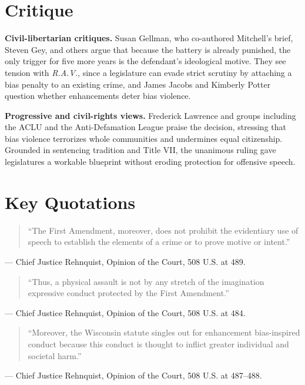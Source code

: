 \documentclass[12pt]{article}
\begin{document}
\section{Critique}

\textbf{Civil-libertarian critiques.} Susan Gellman, who co-authored Mitchell's brief, Steven Gey, and others argue that because the battery is already punished, the only trigger for five more years is the defendant's ideological motive. They see tension with \textit{R.A.V.}, since a legislature can evade strict scrutiny by attaching a bias penalty to an existing crime, and James Jacobs and Kimberly Potter question whether enhancements deter bias violence.

\textbf{Progressive and civil-rights views.} Frederick Lawrence and groups including the ACLU and the Anti-Defamation League praise the decision, stressing that bias violence terrorizes whole communities and undermines equal citizenship. Grounded in sentencing tradition and Title VII, the unanimous ruling gave legislatures a workable blueprint without eroding protection for offensive speech.

\section{Key Quotations}

\begin{quote}
``The First Amendment, moreover, does not prohibit the evidentiary use of speech to establish the elements of a crime or to prove motive or intent.''
\end{quote}
\noindent --- Chief Justice Rehnquist, Opinion of the Court, 508 U.S. at 489.

\begin{quote}
``Thus, a physical assault is not by any stretch of the imagination expressive conduct protected by the First Amendment.''
\end{quote}
\noindent --- Chief Justice Rehnquist, Opinion of the Court, 508 U.S. at 484.

\begin{quote}
``Moreover, the Wisconsin statute singles out for enhancement bias-inspired conduct because this conduct is thought to inflict greater individual and societal harm.''
\end{quote}
\noindent --- Chief Justice Rehnquist, Opinion of the Court, 508 U.S. at 487--488.
\end{document}

